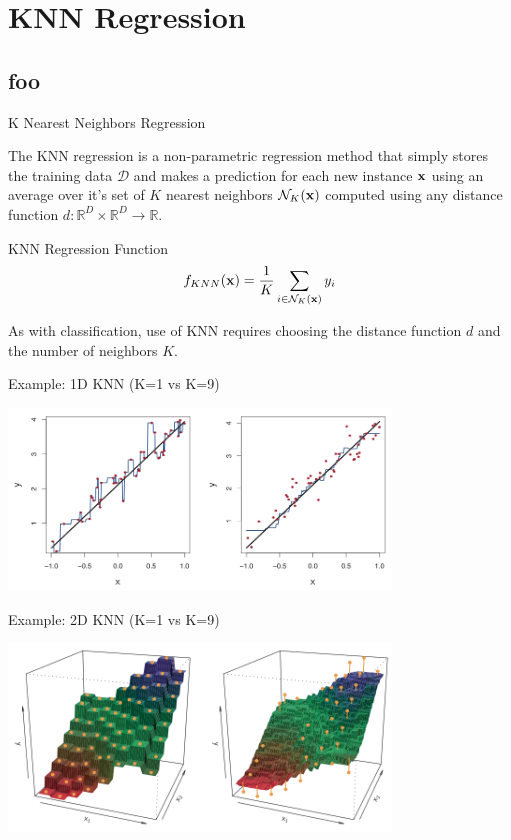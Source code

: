 \documentclass[serif,xcolor=pdftex,dvipsnames,table,hyperref={bookmarks=false,breaklinks}]{beamer}
\begin{document}
\section{KNN Regression}
\subsection{foo}

\begin{frame}[t]{K Nearest Neighbors Regression}

The KNN regression is a non-parametric regression method that simply stores the training data $\mathcal{D}$
and makes a prediction for each new instance ${\mathbf{x}}$ using an average over it's set of $K$ nearest neighbors $\mathcal{N}_K({\mathbf{x}})$ computed using any distance function $d:\mathbb{R}^D \times\mathbb{R}^D \rightarrow \mathbb{R} $.

\pause
\begin{block}{KNN Regression Function}
$$f_{KNN}({\mathbf{x}}) = \frac{1}{K}\sum_{i\in \mathcal{N}_K({\mathbf{x}})} y_i$$
\end{block}

\pause As with classification, use of KNN requires choosing the distance function $d$ and the number of neighbors $K$.
\end{frame}



\begin{frame}[t]{Example: 1D KNN (K=1 vs K=9)}

\center
\includegraphics[width=4in]{../Figures/knn_regression_1d.png}

\end{frame}

\begin{frame}[t]{Example: 2D KNN (K=1 vs K=9)}

\center
\includegraphics[width=4in]{../Figures/knn_regression_2d.png}

\end{frame}
\end{document}
